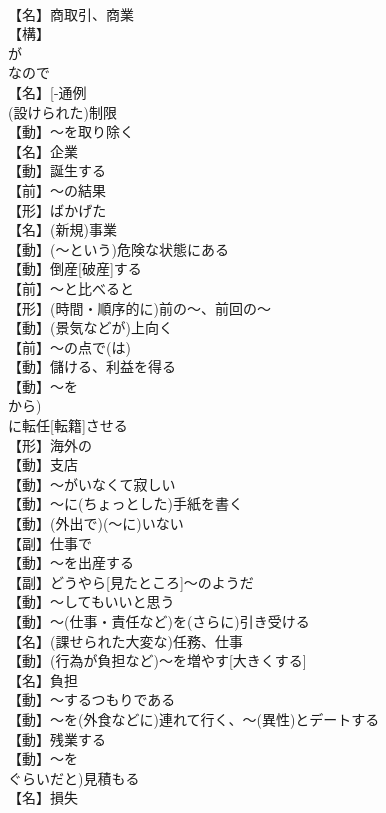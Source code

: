 \documentclass[8pt]{extreport}
\begin{document}
\begin{CJK}{UTF8}{min}
\\	【名】商取引、商業
\\	【構】
\\	が
\\	なので
\\	【名】[-通例
\\	(設けられた)制限
\\	【動】～を取り除く
\\	【名】企業
\\	【動】誕生する
\\	【前】～の結果
\\	【形】ばかげた
\\	【名】(新規)事業
\\	【動】(～という)危険な状態にある
\\	【動】倒産[破産]する
\\	【前】～と比べると
\\	【形】(時間・順序的に)前の～、前回の～
\\	【動】(景気などが)上向く
\\	【前】～の点で(は)
\\	【動】儲ける、利益を得る
\\	【動】～を
\\	から)
\\	に転任[転籍]させる
\\	【形】海外の
\\	【動】支店
\\	【動】～がいなくて寂しい
\\	【動】～に(ちょっとした)手紙を書く
\\	【動】(外出で)(～に)いない
\\	【副】仕事で
\\	【動】～を出産する
\\	【副】どうやら[見たところ]～のようだ
\\	【動】～してもいいと思う
\\	【動】～(仕事・責任など)を(さらに)引き受ける
\\	【名】(課せられた大変な)任務、仕事
\\	【動】(行為が負担など)～を増やす[大きくする]
\\	【名】負担
\\	【動】～するつもりである
\\	【動】～を(外食などに)連れて行く、～(異性)とデートする
\\	【動】残業する
\\	【動】～を
\\	ぐらいだと)見積もる
\\	【名】損失

\end{CJK}
\end{document}
